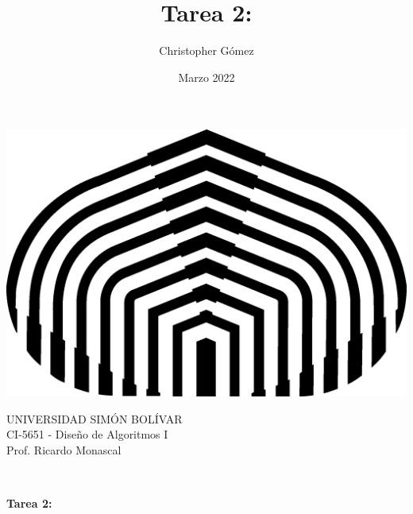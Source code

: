 \documentclass[letterpaper, 12pt]{article}
\title{Tarea 2: }
\author{Christopher Gómez}
\date{Marzo 2022}
\begin{document}
\parbox[t]{.5\linewidth}{
    \centering
    \includegraphics[scale=0.4]{logo.png}
    \begin{center}
        UNIVERSIDAD SIMÓN BOLÍVAR \\
        CI-5651 - Diseño de Algoritmos I \\
        Prof. Ricardo Monascal \\
    \end{center}
}
\hfill {}

\phantom{This text will be invisible} \\
\centerline {\textbf{Tarea 2: }}
\justify
\end{document}
